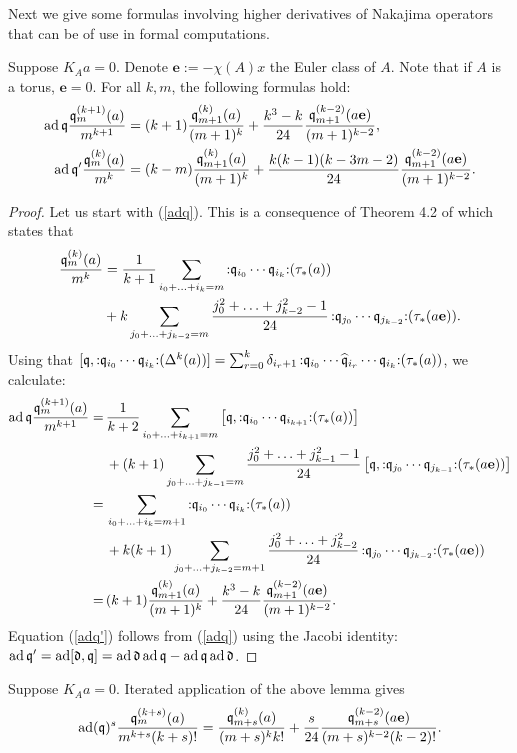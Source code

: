 Next we give some formulas involving higher derivatives of Nakajima operators that can be of use in formal computations.
\begin{proposition}
Suppose $K_Aa=0$. 
Denote $\mathbf e:=-\chi(A)x$ the Euler class of $A$.
Note that if $A$ is a torus, $\mathbf e=0$. 
For all $k,m$, the following formulas hold:
\begin{align}
\label{adq}
\operatorname{ad} \mathfrak{q}  \frac{\mathfrak{q}_m^{(k+1)}(a)}{m^{k+1}} & = (k+1)  \frac{\mathfrak{q}_{m+1}^{(k)}(a)}{(m+1)^{k}} + \frac{k^3-k}{24}\frac{\mathfrak{q}_{m+1}^{(k-2)}(a\mathbf e)}{(m+1)^{k-2}} , \\
\label{adq'}
\operatorname{ad} \mathfrak{q}' \frac{\mathfrak{q}_m^{(k)}(a)}{m^k} & = (k-m) \frac{\mathfrak{q}_{m+1}^{(k)}(a)}{(m+1)^k}+ \frac{k(k-1)(k-3m-2)}{24}\frac{\mathfrak{q}_{m+1}^{(k-2)}(a\mathbf e)}{(m+1)^{k-2}} .
\end{align}
\end{proposition}
\begin{proof}
Let us start with (\ref{adq}). This is a consequence of Theorem 4.2 of \cite{LiQinWang2} which states that 
\begin{align*}
\frac{\mathfrak{q}_m^{(k)}(a)}{m^k}
& = \frac{1}{k+1}\sum_{i_0+\ldots+i_k=m} \mathop{:}\nolimits\! \mathfrak{q}_{i_0}\cdots \mathfrak{q}_{i_k} \!\mathop{:}\nolimits  (\tau_*(a)) \\
& +  k \sum_{j_0+\ldots+j_{k-2}=m} \frac{j_0^2+\ldots+j_{k-2}^2-1}{24}\mathop{:}\nolimits\! \mathfrak{q}_{j_0}\cdots \mathfrak{q}_{j_{k-2}} \!\mathop{:}\nolimits  (\tau_*(a\mathbf e)) .
\end{align*}
Using that 
$[\mathfrak{q},\mathop{:}\nolimits\! \mathfrak{q}_{i_0}\cdots \mathfrak{q}_{i_k} \!\mathop{:}\nolimits  (\Delta^k(a)) ] = \sum_{r=0}^k \delta_{i_r+1} \mathop{:}\nolimits\!\mathfrak{q}_{i_0}\cdots \widehat{\mathfrak{q}}_{i_r} \cdots \mathfrak{q}_{i_k} \!\mathop{:}\nolimits (\tau_*(a))$, 
we calculate:
\begin{align*}
\ad\q \frac{\q_m^{(k+1)}(a)}{m^{k+1}} 
  =\, &\frac{1}{k+2}\sum_{i_0+\ldots+i_{k+1}=m} \left[\q,\nor \q_{i_0}\cdots \q_{i_{k+1}} \mal (\tau_*(a))\right] \\
 & + (k+1) \sum_{j_0+\ldots+j_{k-1}=m} \frac{j_0^2+\ldots+j_{k-1}^2-1}{24}\left[\q,\nor \q_{j_0}\cdots \q_{j_{k-1}} \mal (\tau_*(a\mathbf e)) \right]\\
  =\, & \sum_{i_0+\ldots+i_{k}=m+1} \nor \q_{i_0}\cdots \q_{i_{k}} \mal  (\tau_*(a)) \\
 & + k(k+1) \sum_{j_0+\ldots+j_{k-2}=m+1} \frac{j_0^2+\ldots+j_{k-2}^2}{24}\nor \q_{j_0}\cdots \q_{j_{k-2}} \mal (\tau_*(a\mathbf e)) \\
  =\, & (k+1)  \frac{\q_{m+1}^{(k)}(a)}{(m+1)^{k}} + \frac{k^3-k}{24}\frac{\q_{m+1}^{(k-2)}(a\mathbf e)}{(m+1)^{k-2}}.
\end{align*}
Equation (\ref{adq'}) follows from (\ref{adq}) using the Jacobi identity: $\operatorname{ad} \mathfrak{q}' = \operatorname{ad} [\mathfrak d,\mathfrak{q}] = \operatorname{ad} \mathfrak d  \operatorname{ad} \mathfrak{q} - \operatorname{ad} \mathfrak{q}\operatorname{ad} \mathfrak d  $.
\end{proof}
\begin{corollary} \label{adqCorollary}
Suppose $K_Aa=0$.
Iterated application of the above lemma gives
 \begin{equation}
 \operatorname{ad}(\mathfrak{q})^s \frac{\mathfrak{q}_{m}^{(k+s)}(a)}{m^{k+s}(k+s)!} =\frac{\mathfrak{q}_{m+s}^{(k)}(a)}{(m+s)^kk!} + \frac{s}{24}\frac{\mathfrak{q}_{m+s}^{(k-2)}(a\mathbf e)}{(m+s)^{k-2}(k-2)!}.
\end{equation}
\end{corollary}


